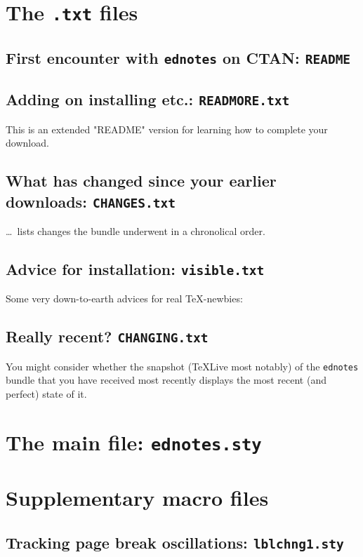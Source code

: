 \documentclass[10pt]{article}
\begin{document}
\tableofcontents

\section{The \texttt{.txt} files}
\subsection{First encounter with \texttt{ednotes} on CTAN: 
            \texttt{README}}

\subsection{Adding on installing etc.: \texttt{READMORE.txt}}
This is an extended "README" version 
for learning how to complete your download. 

\subsection{What has changed since your earlier downloads: 
            \texttt{CHANGES.txt}}
\dots\ lists changes the bundle underwent in a chronolical order. 

\subsection{Advice for installation: \texttt{visible.txt}} 
Some very down-to-earth advices for real \TeX-newbies: 

\subsection{Really recent? \texttt{CHANGING.txt}}
You might consider whether the snapshot (TeXLive most notably) 
of the \texttt{ednotes} bundle that you have received most 
recently displays the most recent (and perfect) state of it. 


\section{The main file: \texttt{ednotes.sty}}


\section{Supplementary macro files}
\subsection{Tracking page break oscillations:
            \texttt{lblchng1.sty}}

\end{document}
